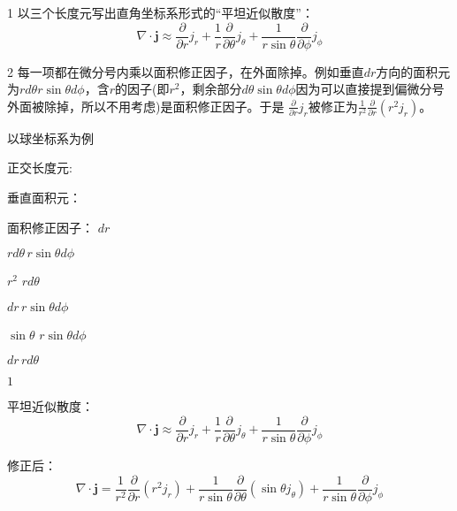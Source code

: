 \documentclass[CJK]{beamer}
\begin{document}
\begin{frame}
  \bch
  \bitem
\item[1]{以三个长度元写出直角坐标系形式的“平坦近似散度”：
  $$\nabla\cdot \mathbf{j} \approx \frac{\partial}{\partial r} j_r + \frac{1}{r} \frac{\partial}{\partial \theta} j_\theta + \frac{1}{r\sin\theta}\frac{\partial}{\partial \phi} j_\phi $$
}
\item[2]{每一项都在微分号内乘以面积修正因子，在外面除掉。例如垂直$dr$方向的面积元为$rd\theta r\sin\theta d\phi$，含$r$的因子(即$r^2$，剩余部分$d\theta\sin\theta d\phi$因为可以直接提到偏微分号外面被除掉，所以不用考虑)是面积修正因子。于是 $\frac{\partial}{\partial r} j_r$被修正为$\frac{1}{r^2}\frac{\partial}{\partial r} (r^2j_r)$。
}
  \eitem
  \ech
\end{frame}


\begin{frame}
  \bch
  以球坐标系为例

  \skiplines

  正交长度元:
  
  垂直面积元：
  
  面积修正因子：
  \emini
  $dr$
  
  $rd\theta\, r\sin\theta d\phi$
  
  $r^2$
  \emini
  $rd\theta$
  
  $dr\, r\sin\theta d\phi$
  
  $\sin\theta$
  \emini
  $r\sin\theta d\phi$
  
  $dr\, rd\theta$
  
  $1$
  \emini

  \skipline
  
  平坦近似散度：
  $$\nabla\cdot \mathbf{j} \approx \frac{\partial}{\partial r} j_r + \frac{1}{r} \frac{\partial}{\partial \theta} j_\theta + \frac{1}{r\sin\theta}\frac{\partial}{\partial \phi} j_\phi $$

  修正后：
  $$\nabla\cdot \mathbf{j} =\frac{1}{r^2} \frac{\partial}{\partial r} (r^2j_r) + \frac{1}{r\sin\theta} \frac{\partial}{\partial \theta} (\sin\theta j_\theta) + \frac{1}{r\sin\theta}\frac{\partial}{\partial \phi} j_\phi $$
  
  \ech
\end{frame}
\end{document}
